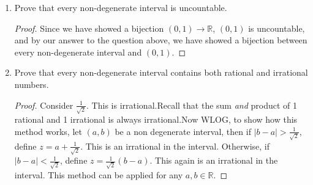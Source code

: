 \documentclass[hidelinks,12pt]{article}
\theoremstyle{definition}
\newcommand{\R}{\mathbb{R}}
\begin{document}
\begin{itemize}
\begin{enumerate}[label=(\alph*)]
\begin{proof}
\begin{enumerate}[label=(\roman*)]
            \item $[a,b]\to(0,1)$
            \item $(a,b)\to(0,1)$
            \item $[a,b)\to(0,1)$
            \item $(a,b]\to(0,1)$
        \end{enumerate}
        Thus, any two non degenerate intervals have the same cardinality.
        \end{proof}
        \item Prove that every non-degenerate interval is uncountable. \begin{proof}Since we have showed a bijection $(0,1)\to\R$, $(0,1)$ is uncountable, and by our answer to the question above, we have showed a bijection between every non-degenerate interval and $(0,1)$.\end{proof}
        \item Prove that every non-degenerate interval contains both rational and irrational numbers.\begin{proof} Consider $\frac{1}{\sqrt{2}}$. This is irrational.\newline Recall that the sum \emph{and} product of 1 rational and 1 irrational is always irrational.\newline Now WLOG, to show how this method works, let $(a,b)$ be a non degenerate interval, then if $|b-a|>\frac{1}{\sqrt{2}}$, define $z=a+\frac{1}{\sqrt{2}}$. This is an irrational in the interval. Otherwise, if $|b-a|<\frac{1}{\sqrt{2}}$, define $z=\frac{1}{\sqrt{2}}(b-a)$. This again is an irrational in the interval. This method can be applied for any $a,b\in\R$. 
        \end{proof}
    \end{enumerate}
\end{itemize}
\end{document}
